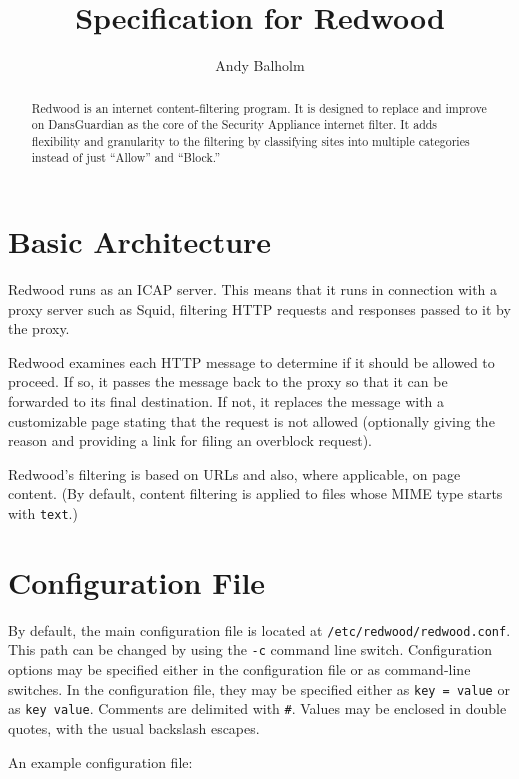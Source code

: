 \documentclass{article}
\title{Specification for Redwood}
\author{Andy Balholm}
\begin{document}
\maketitle

\begin{abstract}

Redwood is an internet content-filtering program. 
It is designed to replace and improve on DansGuardian 
as the core of the Security Appliance internet filter. 
It adds flexibility and granularity to the filtering by classifying sites 
into multiple categories instead of just ``Allow'' and ``Block.'' 

\end{abstract}

\section{Basic Architecture}

Redwood runs as an ICAP server. This means that it runs in connection 
with a proxy server such as Squid, filtering HTTP requests and responses 
passed to it by the proxy.

Redwood examines each HTTP message to determine if it should be allowed to proceed. 
If so, it passes the message back to the proxy so that it can be forwarded 
to its final destination. If not, it replaces the message with a customizable page 
stating that the request is not allowed (optionally giving the reason 
and providing a link for filing an overblock request).

Redwood's filtering is based on URLs and also, where applicable, on page content. 
(By default, content filtering is applied to files whose MIME type starts with \verb"text".)

\section{Configuration File}

By default, the main configuration file is located at \verb"/etc/redwood/redwood.conf". 
This path can be changed by using the \verb"-c" command line switch. 
Configuration options may be specified either in the configuration file or as command-line
switches. In the configuration file, they may be specified either as
\verb"key = value" or as \verb"key value". Comments are delimited with \verb"#". 
Values may be enclosed in double quotes, with the usual backslash escapes.

An example configuration file:
\end{document}
